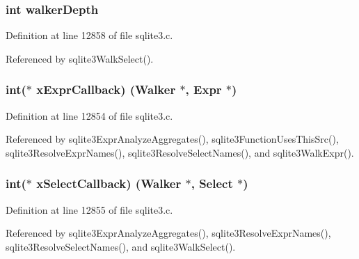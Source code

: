 \subsubsection[{walker\+Depth}]{\setlength{\rightskip}{0pt plus 5cm}int walker\+Depth}\label{struct_walker_a3408c16f995f9fbf7a7f0199b3e6658c}


Definition at line 12858 of file sqlite3.\+c.



Referenced by sqlite3\+Walk\+Select().

\hypertarget{struct_walker_adf159f38811f6fceaaec334f81ca930f}{}
\subsubsection[{x\+Expr\+Callback}]{\setlength{\rightskip}{0pt plus 5cm}int($\ast$ x\+Expr\+Callback) ({\bf Walker} $\ast$, {\bf Expr} $\ast$)}\label{struct_walker_adf159f38811f6fceaaec334f81ca930f}


Definition at line 12854 of file sqlite3.\+c.



Referenced by sqlite3\+Expr\+Analyze\+Aggregates(), sqlite3\+Function\+Uses\+This\+Src(), sqlite3\+Resolve\+Expr\+Names(), sqlite3\+Resolve\+Select\+Names(), and sqlite3\+Walk\+Expr().

\hypertarget{struct_walker_a0e113b69b77d7c738f56b35bfa223e3b}{}
\subsubsection[{x\+Select\+Callback}]{\setlength{\rightskip}{0pt plus 5cm}int($\ast$ x\+Select\+Callback) ({\bf Walker} $\ast$, {\bf Select} $\ast$)}\label{struct_walker_a0e113b69b77d7c738f56b35bfa223e3b}


Definition at line 12855 of file sqlite3.\+c.



Referenced by sqlite3\+Expr\+Analyze\+Aggregates(), sqlite3\+Resolve\+Expr\+Names(), sqlite3\+Resolve\+Select\+Names(), and sqlite3\+Walk\+Select().

\hypertarget{struct_walker_af47ca3398892c8e1b77ecfec55854383}{}
